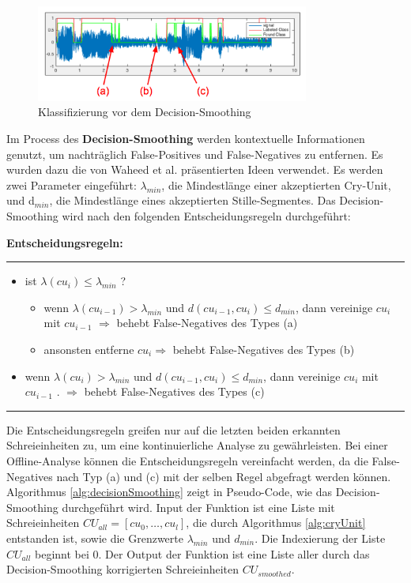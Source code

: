 \begin{figure}[h]
	\centering
	\includegraphics[width=0.8\textwidth]{bilder/smoothing02.png}
	\caption[Klassifizierung vor dem Decision-Smoothing]{Klassifizierung vor dem Decision-Smoothing}
	\label{img:beforeSmoothing}
\end{figure}

Im Process des \textbf{Decision-Smoothing} werden kontextuelle Informationen genutzt, um nachträglich False-Positives und False-Negatives zu entfernen. Es wurden dazu die von Waheed et al. \cite{vad_entropy} präsentierten Ideen verwendet. Es werden zwei Parameter eingeführt: $\lambda_{min}$, die Mindestlänge einer akzeptierten Cry-Unit, und d$_{min}$, die Mindestlänge eines akzeptierten Stille-Segmentes. Das Decision-Smoothing wird nach den folgenden Entscheidungsregeln durchgeführt:

\textbf{Entscheidungsregeln: }\noindent\rule{0.7\linewidth}{0.3pt}
\begin{itemize}
	\item ist $\lambda (cu_{i}) \leq \lambda_{min}$ ?
	\begin{itemize}
		\item wenn $\lambda (cu_{i-1}) > \lambda_{min}$ und $d (cu_{i-1}, cu_{i}) \leq d_{min}$, dann vereinige $cu_{i}$ mit $cu_{i-1}$ $\Longrightarrow$ behebt False-Negatives des Types (a)
		\item ansonsten entferne $cu_i \Longrightarrow$ behebt False-Negatives des Types (b)
	\end{itemize}
	\item wenn $\lambda (cu_{i}) > \lambda_{min}$ und $d (cu_{i-1}, cu_{i}) \leq d_{min}$, dann vereinige $cu_{i}$ mit $cu_{i-1}$ . $\Rightarrow$ behebt False-Negatives des Types (c)
\end{itemize}
\noindent\rule{\linewidth}{0.3pt}

Die Entscheidungsregeln greifen nur auf die letzten beiden erkannten Schreieinheiten zu, um eine kontinuierliche Analyse zu gewährleisten. Bei einer Offline-Analyse können die Entscheidungsregeln vereinfacht werden, da die False-Negatives nach Typ (a) und (c) mit der selben Regel abgefragt werden können. Algorithmus \ref{alg:decisionSmoothing} zeigt in Pseudo-Code, wie das Decision-Smoothing durchgeführt wird. Input der Funktion ist eine Liste mit Schreieinheiten $CU_{all} = [cu_0 , \ldots , cu_l]$, die durch Algorithmus \ref{alg:cryUnit} entstanden ist, sowie die Grenzwerte $\lambda_{min}$ und $d_{min}$. Die Indexierung der Liste $CU_{all}$ beginnt bei 0. Der Output der Funktion ist eine Liste aller durch das Decision-Smoothing korrigierten Schreieinheiten $CU_{smoothed}$.

